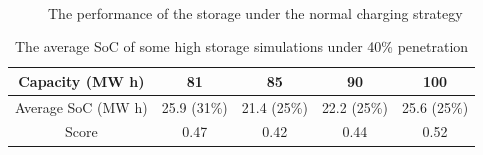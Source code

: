 \documentclass[12pt,a4paper]{report}
\begin{document}
            \begin{figure}[htp]
                \begin{center}
                   \\
                \end{center}
                \caption{The performance of the storage under the normal charging strategy}
                \label{fig_normal_charging}
            \end{figure}
            
            \begin{table}[ht]
                \centering
                \begin{tabulary}{\linewidth}{C C C C C}
                    \hline
                    Capacity (MW h) & 81 & 85 & 90 & 100 \\ \hline
                    Average SoC (MW h) & 25.9 (31\%) & 21.4 (25\%) & 22.2 (25\%) & 25.6 (25\%) \\ \hline
                    Score & 0.47 & 0.42 & 0.44 & 0.52 \\
                    \hline
                \end{tabulary}
                \caption{The average SoC of some high storage simulations under 40\% penetration}
                \label{table_high_storage_40}
            \end{table}
\end{document}
